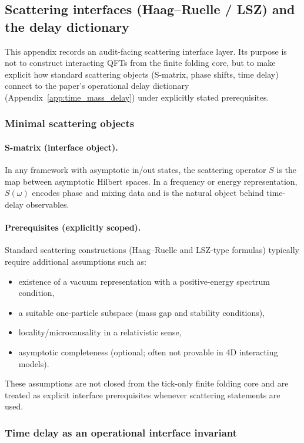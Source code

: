 \subsection{Scattering interfaces (Haag--Ruelle / LSZ) and the delay dictionary}
\label{app:scattering_haag_ruelle_lsz_interface}

This appendix records an audit-facing scattering interface layer.
Its purpose is not to construct interacting QFTs from the finite folding core, but to make explicit how standard scattering objects (S-matrix, phase shifts, time delay) connect to the paper's operational delay dictionary (Appendix~\ref{app:time_mass_delay}) under explicitly stated prerequisites.

\subsubsection{Minimal scattering objects}
\paragraph{S-matrix (interface object).}
\InterfaceTag In any framework with asymptotic in/out states, the scattering operator $S$ is the map between asymptotic Hilbert spaces.
In a frequency or energy representation, $S(\omega)$ encodes phase and mixing data and is the natural object behind time-delay observables.

\paragraph{Prerequisites (explicitly scoped).}
\AuditTag Standard scattering constructions (Haag--Ruelle and LSZ-type formulas) typically require additional assumptions such as:
\begin{itemize}
\item existence of a vacuum representation with a positive-energy spectrum condition,
\item a suitable one-particle subspace (mass gap and stability conditions),
\item locality/microcausality in a relativistic sense,
\item asymptotic completeness (optional; often not provable in 4D interacting models).
\end{itemize}
These assumptions are not closed from the tick-only finite folding core and are treated as explicit interface prerequisites whenever scattering statements are used.

\subsubsection{Time delay as an operational interface invariant}
